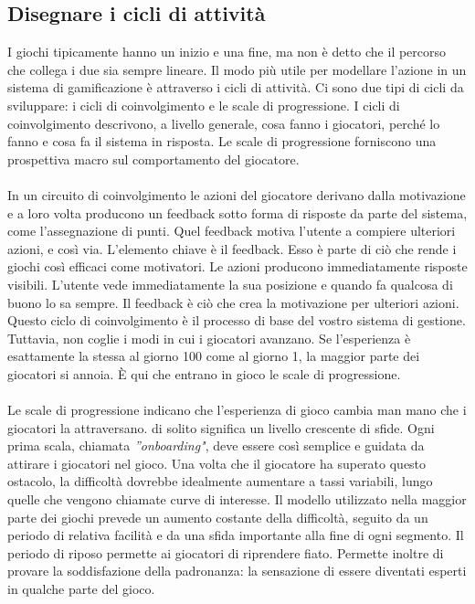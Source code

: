 \begin{itemize}
\subsection{Disegnare i cicli di attività}

I giochi tipicamente hanno un inizio e una fine, ma non è detto che il percorso che collega i due sia sempre lineare. Il modo più utile per modellare l'azione in un sistema di gamificazione è attraverso i cicli di attività. Ci sono due tipi di cicli da sviluppare: i cicli di coinvolgimento e le scale di progressione. I cicli di coinvolgimento descrivono, a livello generale, cosa fanno i giocatori, perché lo fanno e cosa fa il sistema in risposta. Le scale di progressione forniscono una prospettiva macro sul comportamento del giocatore.\\
\\
In un circuito di coinvolgimento le azioni del giocatore derivano dalla motivazione e a loro volta producono un feedback sotto forma di risposte da parte del sistema, come l'assegnazione di punti.
Quel feedback motiva l'utente a compiere ulteriori azioni, e così via.
L'elemento chiave è il feedback. Esso è parte di ciò che rende i giochi così efficaci come motivatori.
Le azioni producono immediatamente risposte visibili. L'utente vede immediatamente la sua posizione e quando fa qualcosa di buono lo sa sempre. Il feedback è ciò che crea la motivazione per ulteriori azioni.
Questo ciclo di coinvolgimento è il processo di base del vostro sistema di gestione. Tuttavia, non coglie i modi in cui i giocatori avanzano. Se l'esperienza è esattamente la stessa al giorno 100 come al giorno 1, la maggior parte dei giocatori si annoia. È qui che entrano in gioco le scale di progressione.\\
\\
Le scale di progressione indicano che l'esperienza di gioco cambia man mano che i giocatori la attraversano.
di solito significa un livello crescente di sfide. Ogni prima scala, chiamata \textit{”onboarding"}, deve essere così semplice e guidata da attirare i giocatori nel gioco. Una volta che il giocatore ha superato questo ostacolo, la difficoltà dovrebbe idealmente aumentare a tassi variabili, lungo quelle che vengono chiamate curve di interesse. Il modello utilizzato nella maggior parte dei giochi prevede un aumento costante della difficoltà, seguito da un periodo di relativa facilità e da una sfida importante alla fine di ogni segmento. Il periodo di riposo permette ai giocatori di riprendere fiato. Permette inoltre di provare la soddisfazione della padronanza: la sensazione di essere diventati esperti in qualche parte del gioco.

\end{itemize}
